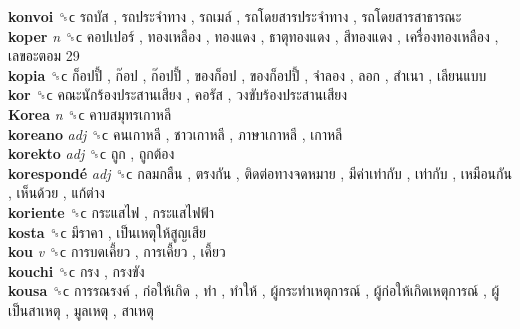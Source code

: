 \textbf{konvoi} ␝ϲ   รถบัส ,  รถประจำทาง ,  รถเมล์ ,  รถโดยสารประจำทาง ,  รถโดยสารสาธารณะ   \\
\textbf{koper} \emph{n}  ␝ϲ   คอปเปอร์ ,  ทองเหลือง ,  ทองแดง ,  ธาตุทองแดง ,  สีทองแดง ,  เครื่องทองเหลือง ,  เลขอะตอม 29   \\
\textbf{kopia} ␝ϲ   ก็อปปี้ ,  ก๊อป ,  ก๊อปปี้ ,  ของก็อป ,  ของก็อปปี้ ,  จำลอง ,  ลอก ,  สำเนา ,  เลียนแบบ   \\
\textbf{kor} ␝ϲ   คณะนักร้องประสานเสียง ,  คอรัส ,  วงขับร้องประสานเสียง   \\
\textbf{Korea} \emph{n}  ␝ϲ   คาบสมุทรเกาหลี   \\
\textbf{koreano} \emph{adj}  ␝ϲ   คนเกาหลี ,  ชาวเกาหลี ,  ภาษาเกาหลี ,  เกาหลี   \\
\textbf{korekto} \emph{adj}  ␝ϲ   ถูก ,  ถูกต้อง   \\
\textbf{korespondé} \emph{adj}  ␝ϲ   กลมกลืน ,  ตรงกัน ,  ติดต่อทางจดหมาย ,  มีค่าเท่ากับ ,  เท่ากับ ,  เหมือนกัน ,  เห็นด้วย ,  แก้ต่าง   \\
\textbf{koriente} ␝ϲ   กระแสไฟ ,  กระแสไฟฟ้า   \\
\textbf{kosta} ␝ϲ   มีราคา ,  เป็นเหตุให้สูญเสีย   \\
\textbf{kou} \emph{v}  ␝ϲ   การบดเคี้ยว ,  การเคี้ยว ,  เคี้ยว   \\
\textbf{kouchi} ␝ϲ   กรง ,  กรงขัง   \\
\textbf{kousa} ␝ϲ   การรณรงค์ ,  ก่อให้เกิด ,  ทำ ,  ทำให้ ,  ผู้กระทำเหตุการณ์ ,  ผู้ก่อให้เกิดเหตุการณ์ ,  ผู้เป็นสาเหตุ ,  มูลเหตุ ,  สาเหตุ   \\
